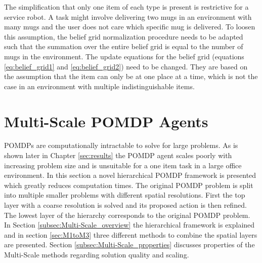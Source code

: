 The simplification that only one item of each type is present is restrictive for a service robot. A task might involve delivering two mugs in an environment with many mugs and the user does not care which specific mug is delivered. To loosen this assumption, the belief grid normalization procedure needs to be adapted such that the summation over the entire belief grid is equal to the number of mugs in the environment. The update equations for the belief grid (equations \ref{eq:belief_grid1} and \ref{eq:belief_grid2}) need to be changed. They are based on the assumption that the item can only be at one place at a time, which is not the case in an environment with multiple indistinguishable items.
 
\section{Multi-Scale POMDP Agents}\label{sec:Multi-Scale}
POMDPs are computationally intractable to solve for large problems. As is shown later in Chapter \ref{sec:results} the POMDP agent scales poorly with increasing problem size and is unsuitable for a one item task in a large office environment. In this section a novel hierarchical POMDP framework is presented which greatly reduces computation times. The original POMDP problem is split into multiple smaller problems with different spatial resolutions. First the top layer with a coarse resolution is solved and its proposed action is then refined. The lowest layer of the hierarchy corresponds to the original POMDP problem.\\

In Section \ref{subsec:Multi-Scale_overview} the hierarchical framework is explained and in section \ref{sec:M1toM3} three different methods to combine the spatial layers are presented. Section \ref{subsec:Multi-Scale_properties} discusses properties of the Multi-Scale methods regarding solution quality and scaling. 

